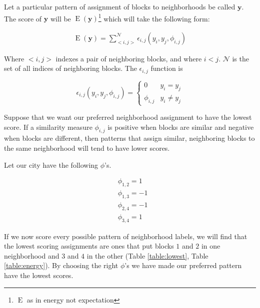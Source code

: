Let a particular pattern of assignment of blocks to neighborhoods
be called $\mathbf{y}$.  The score of $\mathbf{y}$ will be
$\operatorname{E}(\mathbf{y})$\footnote{$\operatorname{E}$ as in
  energy not expectation} which will take the following form:

\begin{align}
\operatorname{E}(\mathbf{y}) = \sum_{<i,j>}^{\mathcal{N}}\epsilon_{i,j}(y_i,y_j,\phi_{i,j})
\end{align}

Where $<i,j>$ indexes a pair of neighboring blocks, and where $i < j$.
$\mathcal{N}$ is the set of all indices of neighboring blocks. The
$\epsilon_{i,j}$ function is 

\begin{equation}
\epsilon_{i,j}(y_i,y_j,\phi_{i,j}) = \begin{cases}
  0 &y_i = y_j \\
  \phi_{i,j} &y_i \neq y_j
\end{cases}
\end{equation}

Suppose that we want our preferred neighborhood assignment to have the
lowest score. If a similarity measure $\phi_{i,j}$ is positive
when blocks are similar and negative when blocks are different, then
patterns that assign similar, neighboring blocks to the same
neighborhood will tend to have lower scores.

Let our city have the following $\phi$'s.

\begin{align*}
&\phi_{1,2} = 1 \\
&\phi_{1,3} = -1 \\
&\phi_{2,4} = -1 \\
&\phi_{3,4} = 1
\end{align*} 

\noindent
If we now score every possible pattern of neighborhood labels, we will
find that the lowest scoring assignments are ones that put blocks $1$
and $2$ in one neighborhood and $3$ and $4$ in the other (Table
\ref{table:lowest}, Table \ref{table:energy}). By choosing the right
$\phi$'s we have made our preferred pattern have the lowest scores.

